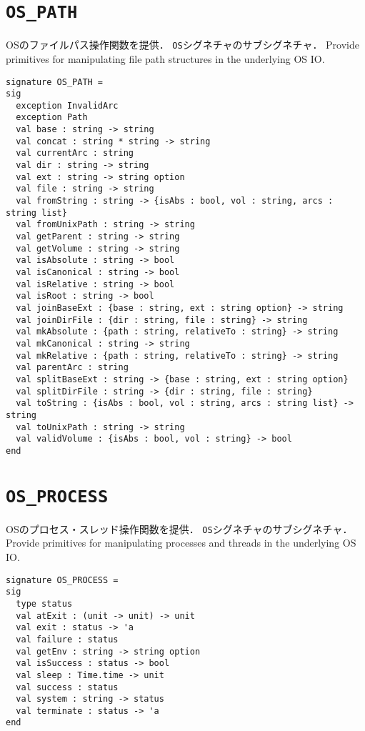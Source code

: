 \documentclass{jbook}
\newcommand{\code}[1]{\mbox{\large\tt #1}}
\newcommand{\signature}[2]{
\section{{\tt #1}}\label{section:reference:#2}
}
\begin{document}
\signature{OS\_PATH}{OSPATH}
\ifjp%
	OSのファイルパス操作関数を提供．
	\code{OS}シグネチャのサブシグネチャ．
\else%
	Provide primitives for manipulating file path structures in the underlying OS IO.
\fi%

\begin{verbatim}
signature OS_PATH =
sig
  exception InvalidArc
  exception Path
  val base : string -> string
  val concat : string * string -> string
  val currentArc : string
  val dir : string -> string
  val ext : string -> string option
  val file : string -> string
  val fromString : string -> {isAbs : bool, vol : string, arcs : string list}
  val fromUnixPath : string -> string
  val getParent : string -> string
  val getVolume : string -> string
  val isAbsolute : string -> bool
  val isCanonical : string -> bool
  val isRelative : string -> bool
  val isRoot : string -> bool
  val joinBaseExt : {base : string, ext : string option} -> string
  val joinDirFile : {dir : string, file : string} -> string
  val mkAbsolute : {path : string, relativeTo : string} -> string
  val mkCanonical : string -> string
  val mkRelative : {path : string, relativeTo : string} -> string
  val parentArc : string
  val splitBaseExt : string -> {base : string, ext : string option}
  val splitDirFile : string -> {dir : string, file : string}
  val toString : {isAbs : bool, vol : string, arcs : string list} -> string
  val toUnixPath : string -> string
  val validVolume : {isAbs : bool, vol : string} -> bool
end
\end{verbatim}

\signature{OS\_PROCESS}{OSPROCESS}
\ifjp%
	OSのプロセス・スレッド操作関数を提供．
	\code{OS}シグネチャのサブシグネチャ．
\else%
	Provide primitives for manipulating processes and threads in the underlying OS IO.
\fi%
\begin{verbatim}
signature OS_PROCESS =
sig
  type status
  val atExit : (unit -> unit) -> unit
  val exit : status -> 'a
  val failure : status
  val getEnv : string -> string option
  val isSuccess : status -> bool
  val sleep : Time.time -> unit
  val success : status
  val system : string -> status
  val terminate : status -> 'a
end
\end{verbatim}
\end{document}
